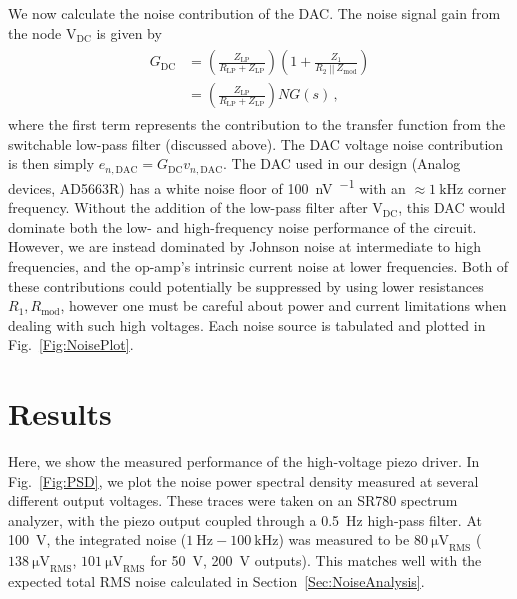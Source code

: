 \documentclass[aip,rsi,reprint]{revtex4-1} %
\newcommand{\epar}{~||~} %
\begin{document}
We now calculate the noise contribution of the DAC.
The noise signal gain from the node $\text{V}_{\text{DC}}$ is given by
\begin{align}
\begin{split}
\label{Eq:Gdc}
G_{\text{DC}} &= \left(\frac{Z_\text{LP}}{R_\text{LP} + Z_\text{LP}}\right)\left(1+\frac{Z_1}{R_2\epar Z_{\text{mod}}}\right) \\
&= \left(\frac{Z_\text{LP}}{R_\text{LP} + Z_\text{LP}}\right)NG(s)\,,
\end{split}
\end{align}
where the first term represents the contribution to the transfer function from the switchable low-pass filter (discussed above).
The DAC voltage noise contribution is then simply $e_{n,\text{DAC}} = G_{\text{DC}} v_{n,\text{DAC}}$. 
The DAC used in our design (Analog devices, AD5663R) has a white noise floor of \SI[per-mode=symbol]{100}{\nano\volt\per\sqrthz} with an $\approx\SI{1}{\kilo\hertz}$ corner frequency.
Without the addition of the low-pass filter after $\text{V}_\text{DC}$, this DAC would dominate both the low- and high-frequency noise performance of the circuit.
However, we are instead dominated by Johnson noise at intermediate to high frequencies, and the op-amp's intrinsic current noise at lower frequencies.
Both of these contributions could potentially be suppressed by using lower resistances $R_1, R_\text{mod}$, however one must be careful about power and current limitations when dealing with such high voltages.
Each noise source is tabulated and plotted in Fig.~\ref{Fig:NoisePlot}.


\section{Results}
\label{Sec:Results}
Here, we show the measured performance of the high-voltage piezo driver.
In Fig.~\ref{Fig:PSD}, we plot the noise power spectral density measured at several different output voltages.
These traces were taken on an SR780 spectrum analyzer, with the piezo output coupled through a \SI{0.5}{\hertz} high-pass filter. 
At \SI{100}{\volt}, the integrated noise ($\SI{1}{\hertz} - \SI{100}{\kilo\hertz}$) was measured to be $\SI{80}{\micro\volt}_\text{RMS}$ ($\SI{138}{\micro\volt}_\text{RMS}$, $\SI{101}{\micro\volt}_\text{RMS}$ for \SI{50}{\volt}, \SI{200}{\volt} outputs). 
This matches well with the expected total RMS noise calculated in Section~\ref{Sec:NoiseAnalysis}.
\end{document}
